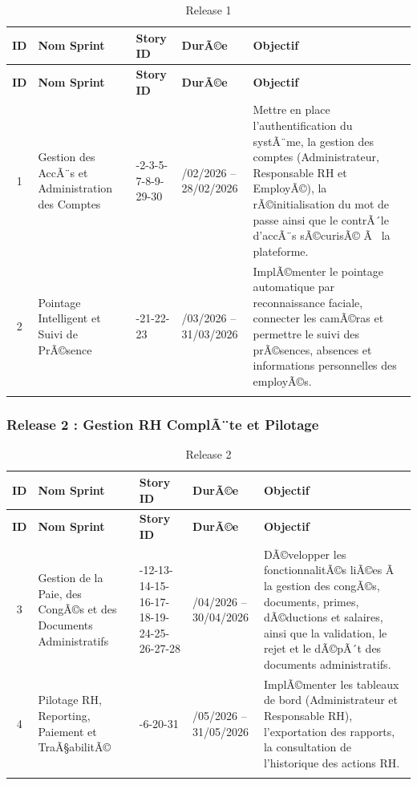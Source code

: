 \begin{longtable}{|c|>{\raggedright\arraybackslash}p{4.2cm}|
    >{\centering\arraybackslash}p{2.5cm}|
    >{\centering\arraybackslash}p{3.5cm}|
    >{\raggedright\arraybackslash}p{5.5cm}|}
\hline
\textbf{ID} & \textbf{Nom Sprint} & \textbf{Story ID} & \textbf{DurÃ©e} & \textbf{Objectif} \\
\hline
\endfirsthead
\hline
\textbf{ID} & \textbf{Nom Sprint} & \textbf{Story ID} & \textbf{DurÃ©e} & \textbf{Objectif} \\
\hline
\endhead
1 & Gestion des AccÃ¨s et Administration des Comptes
  & 1-2-3-5-7-8-9-29-30
  & 01/02/2026 -- 28/02/2026
  & Mettre en place l'authentification du systÃ¨me, la gestion des comptes
    (Administrateur, Responsable RH et EmployÃ©), la rÃ©initialisation du mot de
    passe ainsi que le contrÃ´le d'accÃ¨s sÃ©curisÃ© Ã  la plateforme. \\ \hline
2 & Pointage Intelligent et Suivi de PrÃ©sence
  & 10-21-22-23
  & 01/03/2026 -- 31/03/2026
  & ImplÃ©menter le pointage automatique par reconnaissance faciale, connecter
    les camÃ©ras et permettre le suivi des prÃ©sences, absences et informations
    personnelles des employÃ©s. \\ \hline
\caption{Release 1}
\end{longtable}

\subsubsection*{Release 2 : Gestion RH ComplÃ¨te et Pilotage}

\begin{longtable}{|c|>{\raggedright\arraybackslash}p{4.2cm}|
    >{\centering\arraybackslash}p{2.5cm}|
    >{\centering\arraybackslash}p{3.5cm}|
    >{\raggedright\arraybackslash}p{5.5cm}|}
\hline
\textbf{ID} & \textbf{Nom Sprint} & \textbf{Story ID} & \textbf{DurÃ©e} & \textbf{Objectif} \\
\hline
\endfirsthead
\hline
\textbf{ID} & \textbf{Nom Sprint} & \textbf{Story ID} & \textbf{DurÃ©e} & \textbf{Objectif} \\
\hline
\endhead
3 & Gestion de la Paie, des CongÃ©s et des Documents Administratifs
  & 11-12-13-14-15-16-17-18-19-24-25-26-27-28
  & 01/04/2026 -- 30/04/2026
  & DÃ©velopper les fonctionnalitÃ©s liÃ©es Ã  la gestion des congÃ©s, documents,
    primes, dÃ©ductions et salaires, ainsi que la validation, le rejet et le
    dÃ©pÃ´t des documents administratifs. \\ \hline
4 & Pilotage RH, Reporting, Paiement et TraÃ§abilitÃ©
  & 4-6-20-31
  & 01/05/2026 -- 31/05/2026
  & ImplÃ©menter les tableaux de bord (Administrateur et Responsable RH),
    l'exportation des rapports, la consultation de l'historique des actions
    RH. \\ \hline
\caption{Release 2}
\end{longtable}

